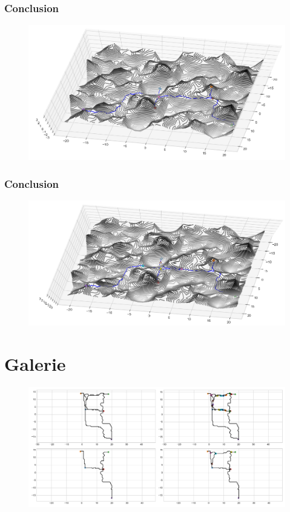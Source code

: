 \documentclass{beamer}[11pt]
\begin{document}
	\begin{frame}
		\frametitle{Conclusion}
		\begin{figure}[t]
			\includegraphics[width=1\textwidth]{Pics/g22.png}
		\end{figure}
	\end{frame}

	\begin{frame}
		\frametitle{Conclusion}
		\begin{figure}[t]
			\includegraphics[width=1\textwidth]{Pics/g23.png}
		\end{figure}
	\end{frame}

\appendix

	\begin{frame}
		\tableofcontents
	\end{frame}

	\section{Galerie}

		\begin{frame}
			\begin{figure}[t]
				\includegraphics[width=1\textwidth]{Pics/g11.png}
			\end{figure}
		\end{frame}
\end{document}
